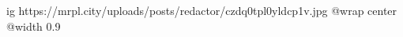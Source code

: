  
 
 
 
 

\ifcmt
  ig https://mrpl.city/uploads/posts/redactor/czdq0tpl0yldcp1v.jpg
  @wrap center
  @width 0.9
\fi
